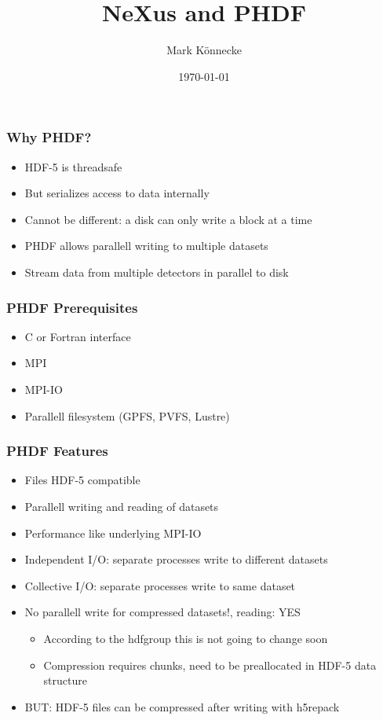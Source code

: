 \documentclass{beamer}
\title{NeXus and PHDF}
\author{Mark K\"onnecke }
\institute{Paul Scherrer Institute\\Switzerland }
\date{\today}
\begin{document}
\begin{frame}
\titlepage
\end{frame}

\begin{frame}
\frametitle{Why PHDF?}
\begin{itemize}
\item HDF-5 is threadsafe
\item But serializes access to data internally
\item Cannot be different: a disk can only write a block at a time
\item PHDF allows parallell writing to multiple datasets
\item Stream data from multiple detectors in parallel to disk
\end{itemize}
\end{frame}

\begin{frame}
\frametitle{PHDF Prerequisites}
\begin{itemize}
\item C or Fortran interface
\item MPI 
\item MPI-IO
\item Parallell filesystem (GPFS, PVFS, Lustre)
\end{itemize}
\end{frame}

\begin{frame}
\frametitle{PHDF Features}
\begin{itemize}
\item<1-> Files HDF-5 compatible
\item<1-> Parallell writing and reading of datasets
\item<1-> Performance like underlying MPI-IO
\item<1-> Independent I/O: separate processes write to different datasets
\item<1-> Collective I/O: separate processes write to same dataset
\item<2->  {\color{red}No parallell write for compressed datasets!}, reading: YES
\begin{itemize}
\item<2-> According to the hdfgroup this is not going to change soon
\item<2-> Compression requires chunks, need to be preallocated in HDF-5 data structure
\end{itemize}
\item<3-> {\color{green}BUT: HDF-5 files can be compressed after writing with h5repack}
\end{itemize}
\end{frame}
\end{document}

